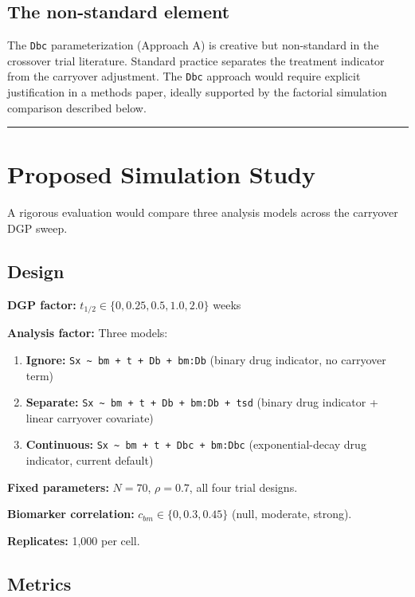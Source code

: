 \documentclass[11pt]{article}
\begin{document}
\subsection{The non-standard element}

The \texttt{Dbc} parameterization (Approach A) is creative but
non-standard in the crossover trial literature. Standard practice
separates the treatment indicator from the carryover adjustment.
The \texttt{Dbc} approach would require explicit justification in a
methods paper, ideally supported by the factorial simulation
comparison described below.

\bigskip\noindent\rule{\textwidth}{0.4pt}\bigskip

\section{Proposed Simulation Study}

A rigorous evaluation would compare three analysis models across
the carryover DGP sweep.

\subsection{Design}

\textbf{DGP factor:} $t_{1/2} \in \{0, 0.25, 0.5, 1.0, 2.0\}$ weeks

\textbf{Analysis factor:} Three models:

\begin{enumerate}
  \item \textbf{Ignore:} \texttt{Sx \~{} bm + t + Db + bm:Db}
    (binary drug indicator, no carryover term)
  \item \textbf{Separate:} \texttt{Sx \~{} bm + t + Db + bm:Db + tsd}
    (binary drug indicator + linear carryover covariate)
  \item \textbf{Continuous:} \texttt{Sx \~{} bm + t + Dbc + bm:Dbc}
    (exponential-decay drug indicator, current default)
\end{enumerate}

\textbf{Fixed parameters:} $N = 70$, $\rho = 0.7$, all four trial
designs.

\textbf{Biomarker correlation:} $c_{bm} \in \{0, 0.3, 0.45\}$
(null, moderate, strong).

\textbf{Replicates:} 1,000 per cell.

\subsection{Metrics}
\end{document}
